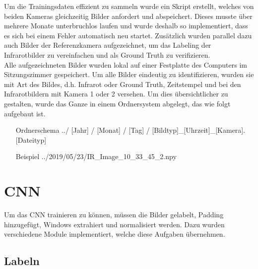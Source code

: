 Um die Trainingsdaten effizient zu sammeln wurde ein  Skript erstellt, welches von beiden Kameras gleichzeitig Bilder anfordert und abspeichert. Dieses musste über mehrere Monate unterbruchlos laufen und wurde deshalb so implementiert, dass es sich bei einem Fehler automatisch neu startet. Zusätzlich wurden parallel dazu auch Bilder der Referenzkamera aufgezeichnet, um das Labeling der Infrarotbilder zu vereinfachen und als Ground Truth zu verifizieren.\\
Alle aufgezeichneten Bilder wurden lokal auf einer Festplatte des Computers im Sitzungszimmer gespeichert. Um alle Bilder eindeutig zu identifizieren, wurden sie mit Art des Bildes, d.h. Infrarot oder Ground Truth, Zeitstempel und bei den Infrarotbildern mit Kamera 1 oder 2 versehen. Um dies übersichtlicher zu gestalten, wurde das Ganze in einem Ordnersystem abgelegt, das wie folgt aufgebaut ist.

\begin{itemize}[leftmargin=4cm, align=left, labelsep=*, labelwidth=*]
	\item[Ordnerschema] ../ [Jahr] / [Monat] / [Tag] / [Bildtyp]\_[Uhrzeit]\_[Kamera].[Dateityp]
	\item[Beispiel] ../2019/05/23/IR\_Image\_10\_33\_45\_2.npy
\end{itemize}


\section{CNN}

Um das \gls{CNN} trainieren zu können, müssen die Bilder gelabelt, \gls{Padding} hinzugefügt, \glspl{Window} extrahiert und normalisiert werden. Dazu wurden verschiedene Module implementiert, welche diese Aufgaben übernehmen.

\subsection{Labeln}
\label{sec:labeling}

